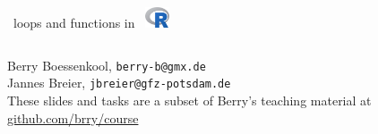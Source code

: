 \documentclass[xcolor=table,      handout ,    xcolor=dvipsnames]{beamer}\usepackage[]{graphicx}\usepackage[]{color}
\begin{document}








{
\begin{frame}
\begin{center}
    \begin{columns}
    \column{15em}
    \begin{block}{}{\Large ~loops and functions in~ \includegraphics[width=0.7cm]{externalfig/Rlogo.png}}
    \end{block}
    \end{columns}
\vspace{1em}
Berry Boessenkool, \texttt{berry-b@gmx.de}\\
Jannes Breier, \texttt{jbreier@gfz-potsdam.de}\\[1em]
These slides and tasks are a subset of Berry's teaching material at\\
\href{https://github.com/brry/course}{github.com/brry/course}\\[1em]

\end{center}
\end{frame}}
\end{document}
